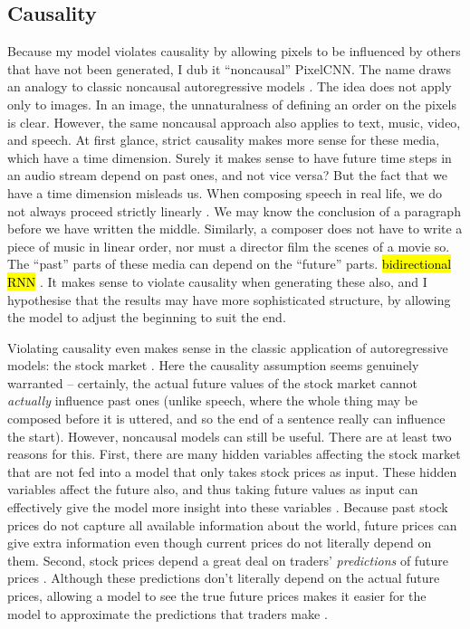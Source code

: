 \documentclass[10pt,a4paper]{article}
\newcommand{\nquote}[1]{``{#1}''}
\begin{document}
\subsection{Causality}

Because my model violates causality by allowing pixels to be influenced by others that have not been generated, I dub it \nquote{noncausal} PixelCNN. The name draws an analogy to classic noncausal autoregressive models \cite{??} \cite{??}. The idea does not apply only to images. In an image, the unnaturalness of defining an order on the pixels is clear. However, the same noncausal approach also applies to text, music, video, and speech. At first glance, strict causality makes more sense for these media, which have a time dimension. Surely it makes sense to have future time steps in an audio stream depend on past ones, and not vice versa? But the fact that we have a time dimension misleads us. When composing speech in real life, we do not always proceed strictly linearly \cite{??}. We may know the conclusion of a paragraph before we have written the middle. Similarly, a composer does not have to write a piece of music in linear order, nor must a director film the scenes of a movie so. The \nquote{past} parts of these media can depend on the \nquote{future} parts. \hl{bidirectional RNN} \cite{??}. It makes sense to violate causality when generating these also, and I hypothesise that the results may have more sophisticated structure, by allowing the model to adjust the beginning to suit the end.

Violating causality even makes sense in the classic application of autoregressive models: the stock market \cite{??}. Here the causality assumption seems genuinely warranted -- certainly, the actual future values of the stock market cannot \emph{actually} influence past ones (unlike speech, where the whole thing may be composed before it is uttered, and so the end of a sentence really can influence the start). However, noncausal models can still be useful. There are at least two reasons for this. First, there are many hidden variables affecting the stock market that are not fed into a model that only takes stock prices as input. These hidden variables affect the future also, and thus taking future values as input can effectively give the model more insight into these variables \cite{??}. Because past stock prices do not capture all available information about the world, future prices can give extra information even though current prices do not literally depend on them. Second, stock prices depend a great deal on traders' \emph{predictions} of future prices \cite{??}. Although these predictions don't literally depend on the actual future prices, allowing a model to see the true future prices makes it easier for the model to approximate the predictions that traders make \cite{??}.
\end{document}
